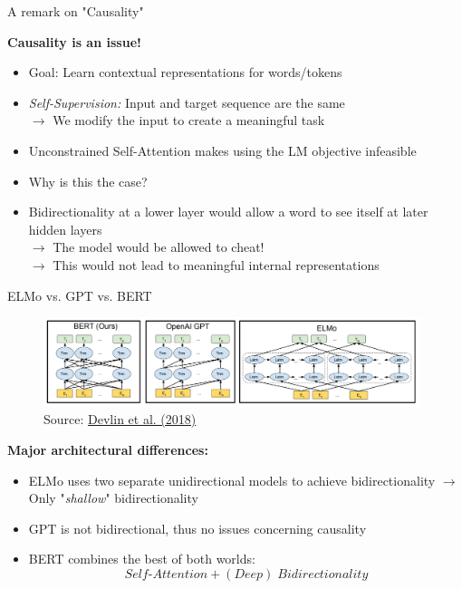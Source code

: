
\begin{frame}{A remark on "Causality"}

\vfill

\textbf{Causality is an issue!}
	
\begin{itemize}
	\item Goal: Learn contextual representations for words/tokens
	\item \textit{Self-Supervision:} Input and target sequence are the same\\
				$\rightarrow$ We modify the input to create a meaningful task 
	\item \warning Unconstrained Self-Attention makes using the LM objective infeasible
	\item \ques Why is this the case?
	\pause
	\item[] Bidirectionality at a lower layer would allow a word to see itself at later hidden layers\\
				$\rightarrow$ The model would be allowed to cheat!\\
				$\rightarrow$ This would not lead to meaningful internal representations
\end{itemize}

\vfill

\end{frame}


\begin{vbframe}{ELMo vs. GPT vs. BERT}

\vfill

\begin{figure}
\centering
\includegraphics[width = 11cm]{figure/comparison-bert.png}\\ 
\footnotesize{Source:} \href{https://arxiv.org/pdf/1810.04805.pdf}{Devlin et al. (2018)}
\end{figure}

\textbf{Major architectural differences:}

\begin{itemize}
\item ELMo uses two separate unidirectional models to achieve bidirectionality 
  $\rightarrow$ Only "\textit{shallow}" bidirectionality
\item GPT is not bidirectional, thus no issues concerning causality
\item BERT combines the best of both worlds: $$Self\text{-}Attention + (Deep)\;Bidirectionality$$
\end{itemize} 

\vfill

\end{vbframe}

